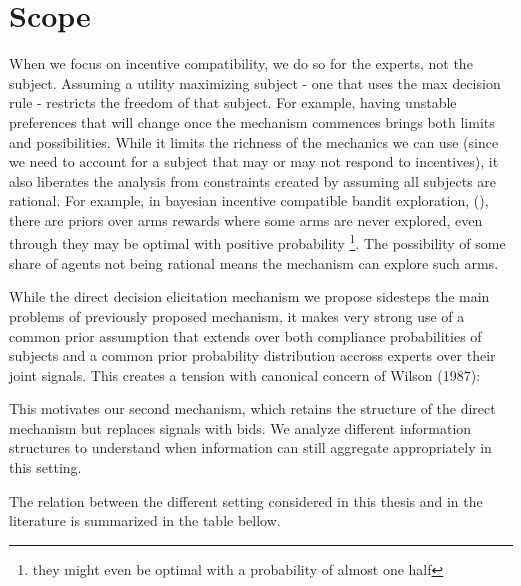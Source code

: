 \section{Scope}

When we focus on incentive compatibility, we do so for the experts, not the subject.
Assuming a utility maximizing subject - one that uses the max decision rule - restricts the freedom of that subject.
For example, having unstable preferences that will change once the mechanism commences brings both limits and possibilities.
While it limits the richness of the mechanics we can use (since we need to account for a subject that may or may not respond to incentives), it also liberates the analysis from constraints created by assuming all subjects are rational.
For example, in bayesian incentive compatible bandit exploration, (\cite{mansour2015bayesian}), there are priors over arms rewards where some arms are never explored, even through they may be optimal with positive probability \footnote{they might even be optimal with a probability of almost one half}. The possibility of some share of agents not being rational means the mechanism can explore such arms.

While the direct decision elicitation mechanism we propose sidesteps the main problems of previously proposed mechanism, it makes very strong use of a common prior assumption that extends over both compliance probabilities of subjects and a common prior probability distribution accross experts over their joint signals. This creates a tension with canonical concern of Wilson (1987):


This motivates our second mechanism, which retains the structure of the direct mechanism but replaces signals with bids. We analyze different information structures to understand when information can still aggregate appropriately in this setting.

The relation between the different setting considered in this thesis and in the literature is summarized in the table bellow.

